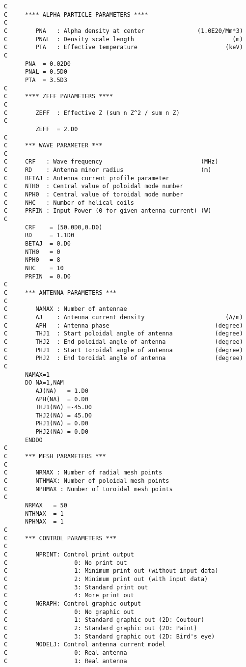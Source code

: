 \documentclass[11pt]{jarticle}
\begin{document}
\begin{verbatim}
C
C     **** ALPHA PARTICLE PARAMETERS ****
C
C        PNA   : Alpha density at center               (1.0E20/Mm*3)
C        PNAL  : Density scale length                            (m)
C        PTA   : Effective temperature                         (keV)
C
      PNA  = 0.02D0
      PNAL = 0.5D0
      PTA  = 3.5D3
C
C     **** ZEFF PARAMETERS ****
C
C        ZEFF  : Effective Z (sum n Z^2 / sum n Z)
C
         ZEFF  = 2.D0
C
C     *** WAVE PARAMETER ***
C
C     CRF   : Wave frequency                            (MHz)
C     RD    : Antenna minor radius                      (m)
C     BETAJ : Antenna current profile parameter
C     NTH0  : Central value of poloidal mode number
C     NPH0  : Central value of toroidal mode number
C     NHC   : Number of helical coils
C     PRFIN : Input Power (0 for given antenna current) (W)
C
      CRF    = (50.0D0,0.D0)
      RD     = 1.1D0
      BETAJ  = 0.D0
      NTH0   = 0
      NPH0   = 8
      NHC    = 10
      PRFIN  = 0.D0
C
C     *** ANTENNA PARAMETERS ***
C
C        NAMAX : Number of antennae
C        AJ    : Antenna current density                       (A/m)
C        APH   : Antenna phase                              (degree)
C        THJ1  : Start poloidal angle of antenna            (degree)
C        THJ2  : End poloidal angle of antenna              (degree)
C        PHJ1  : Start toroidal angle of antenna            (degree)
C        PHJ2  : End toroidal angle of antenna              (degree)
C
      NAMAX=1
      DO NA=1,NAM
         AJ(NA)   = 1.D0
         APH(NA)  = 0.D0
         THJ1(NA) =-45.D0
         THJ2(NA) = 45.D0
         PHJ1(NA) = 0.D0
         PHJ2(NA) = 0.D0
      ENDDO
C
C     *** MESH PARAMETERS ***
C
C        NRMAX : Number of radial mesh points
C        NTHMAX: Number of poloidal mesh points
C        NPHMAX : Number of toroidal mesh points
C
      NRMAX   = 50
      NTHMAX  = 1
      NPHMAX  = 1
C
C     *** CONTROL PARAMETERS ***
C
C        NPRINT: Control print output
C                   0: No print out
C                   1: Minimum print out (without input data)
C                   2: Minimum print out (with input data)
C                   3: Standard print out
C                   4: More print out
C        NGRAPH: Control graphic output
C                   0: No graphic out
C                   1: Standard graphic out (2D: Coutour)
C                   2: Standard graphic out (2D: Paint)
C                   3: Standard graphic out (2D: Bird's eye)
C        MODELJ: Control antenna current model
C                   0: Real antenna
C                   1: Real antenna

\end{verbatim}
\end{document}

